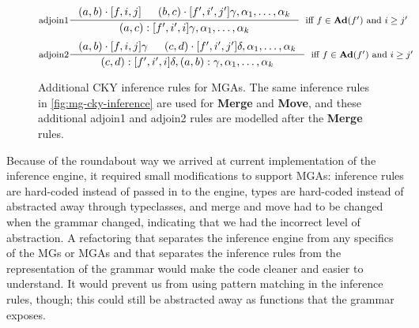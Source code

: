 \documentclass{article}
\begin{document}
\begin{figure}[h]
  \centering
  \[
    \inference[adjoin1]{
      (a, b) \cdot [f,i,j] &
      (b, c) \cdot [f',i',j'] \gamma, \alpha_1, \dots, \alpha_k
    }{
      (a, c) : [f', i', i]\gamma, \alpha_1, \dots, \alpha_k
    }[iff $f \in \mathbf{Ad}(f')$ and $i \geq j'$]
  \]
  \[
    \inference[adjoin2]{
      (a, b) \cdot [f,i,j] \gamma &
      (c, d) \cdot [f',i',j'] \delta, \alpha_1, \dots, \alpha_k
    }{
      (c, d) : [f', i', i]\delta, (a, b) : \gamma, \alpha_1, \dots, \alpha_k
    }[iff $f \in \mathbf{Ad}(f')$ and $i \geq j'$]
  \]
  \caption{Additional CKY inference rules for MGAs.  The same
    inference rules in \ref{fig:mg-cky-inference} are used for
    \textbf{Merge} and \textbf{Move}, and these additional adjoin1 and
    adjoin2 rules are modelled after the \textbf{Merge} rules.}
  \label{fig:mga-cky-inference}
\end{figure}

Because of the roundabout way we arrived at current implementation of
the inference engine, it required small modifications to support MGAs:
inference rules are hard-coded instead of passed in to the engine,
types are hard-coded instead of abstracted away through typeclasses,
and merge and move had to be changed when the grammar changed,
indicating that we had the incorrect level of abstraction.  A
refactoring that separates the inference engine from any specifics of
the MGs or MGAs and that separates the inference rules from the
representation of the grammar would make the code cleaner and easier
to understand.  It would prevent us from using pattern matching in the
inference rules, though; this could still be abstracted away as
functions that the grammar exposes.
\end{document}
